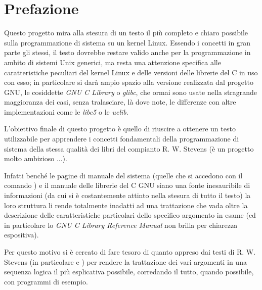 
\chapter{Prefazione}
\label{cha:preface}

Questo progetto mira alla stesura di un testo il più completo e chiaro
possibile sulla programmazione di sistema su un kernel Linux.  Essendo i
concetti in gran parte gli stessi, il testo dovrebbe restare valido anche per
la programmazione in ambito di sistemi Unix generici, ma resta una attenzione
specifica alle caratteristiche peculiari del kernel Linux e delle versioni
delle librerie del C in uso con esso; in particolare si darà ampio spazio alla
versione realizzata dal progetto GNU, le cosiddette \textit{GNU C Library} o
\textsl{glibc}, che ormai sono usate nella stragrande maggioranza dei casi,
senza tralasciare, là dove note, le differenze con altre implementazioni come
le \textsl{libc5} o le \textsl{uclib}.

L'obiettivo finale di questo progetto è quello di riuscire a ottenere un testo
utilizzabile per apprendere i concetti fondamentali della programmazione di
sistema della stessa qualità dei libri del compianto R. W. Stevens (è un
progetto molto ambizioso ...).

Infatti benché le pagine di manuale del sistema (quelle che si accedono con il
comando ) e il manuale delle librerie del C GNU siano una fonte
inesauribile di informazioni (da cui si è costantemente attinto nella stesura
di tutto il testo) la loro struttura li rende totalmente inadatti ad una
trattazione che vada oltre la descrizione delle caratteristiche particolari
dello specifico argomento in esame (ed in particolare lo \textit{GNU C Library
  Reference Manual} non brilla per chiarezza espositiva).

Per questo motivo si è cercato di fare tesoro di quanto appreso dai testi di
R. W. Stevens (in particolare \cite{APUE} e \cite{UNP1}) per rendere la
trattazione dei vari argomenti in una sequenza logica il più esplicativa
possibile, corredando il tutto, quando possibile, con programmi di esempio.

